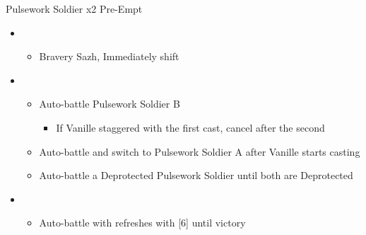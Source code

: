 \begin{multicols}{2}
\begin{battle}{Pulsework Soldier x2 Pre-Empt}
\begin{itemize}
    \item \second
    \begin{itemize}
        \item Bravery Sazh, Immediately shift
    \end{itemize}
    \item \third
    \begin{itemize}
        \item Auto-battle Pulsework Soldier B
        \begin{itemize}
            \item If Vanille staggered with the first cast, cancel after the second
        \end{itemize}
        \item Auto-battle and switch to Pulsework Soldier A after Vanille starts casting
        \item Auto-battle a Deprotected Pulsework Soldier until both are Deprotected
    \end{itemize}
    \item \first
    \begin{itemize}
        \item Auto-battle with refreshes with [6] until victory
    \end{itemize}
\end{itemize}
\end{battle}


\end{multicols}
